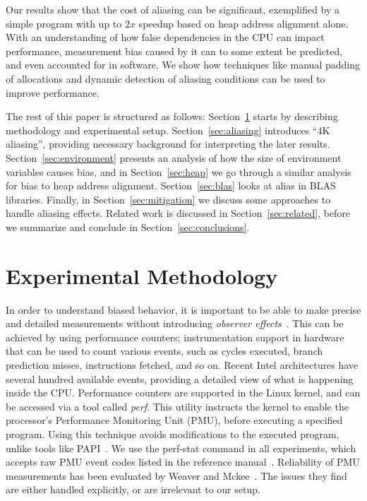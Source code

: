 \documentclass[10pt, conference, compsocconf]{IEEEtran}
\begin{document}
Our results show that the cost of aliasing can be significant, exemplified by a simple program with up to $2x$ speedup based on heap address alignment alone.
With an understanding of how false dependencies in the CPU can impact performance, measurement bias caused by it can to some extent be predicted, and even accounted for in software.
We show how techniques like manual padding of allocations and dynamic detection of aliasing conditions can be used to improve performance. 

The rest of this paper is structured as follows:
Section~\ref{sec:methodology} starts by describing methodology and experimental setup.
Section~\ref{sec:aliasing} introduces ``4K aliasing'', providing necessary background for interpreting the later results.
Section~\ref{sec:environment} presents an analysis of how the size of environment variables causes bias, and in Section~\ref{sec:heap} we go through a similar analysis for bias to heap address alignment.
Section~\ref{sec:blas} looks at alias in BLAS libraries.
Finally, in Section~\ref{sec:mitigation} we discuss some approaches to handle aliasing effects.
Related work is discussed in Section~\ref{sec:related}, before we summarize and conclude in Section~\ref{sec:conclusions}.

\section{Experimental Methodology}
\label{sec:methodology}
In order to understand biased behavior, it is important to be able to make precise and detailed measurements without introducing \emph{observer effects}~\cite{Mytkowicz:2008:OE&MB}.
This can be achieved by using performance counters; instrumentation support in hardware that can be used to count various events, such as cycles executed, branch prediction misses, instructions fetched, and so on.
Recent Intel architectures have several hundred available events, providing a detailed view of what is happening inside the CPU.
Performance counters are supported in the Linux kernel, and can be accessed via a tool called \emph{perf}.
This utility instructs the kernel to enable the processor's Performance Monitoring Unit (PMU), before executing a specified program.
Using this technique avoids modifications to the executed program, unlike tools like PAPI~\cite{PAPI:PortableInterface}.
We use the perf-stat command in all experiments, which accepts raw PMU event codes listed in the reference manual~\cite{Volume3B}.
Reliability of PMU measurements has been evaluated by Weaver and Mckee~\cite{Weaver:2008:PCTrusted}.
The issues they find are either handled explicitly, or are irrelevant to our setup.
\end{document}
